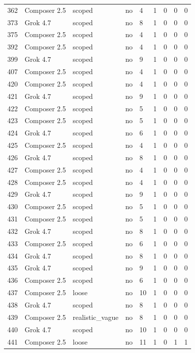 \begin{tabular}{lllllllll}
362 & Composer 2.5 & scoped & no & 4 & 1 & 0 & 0 & 0 \\
373 & Grok 4.7 & scoped & no & 8 & 1 & 0 & 0 & 0 \\
375 & Composer 2.5 & scoped & no & 4 & 1 & 0 & 0 & 0 \\
392 & Composer 2.5 & scoped & no & 4 & 1 & 0 & 0 & 0 \\
399 & Grok 4.7 & scoped & no & 9 & 1 & 0 & 0 & 0 \\
407 & Composer 2.5 & scoped & no & 4 & 1 & 0 & 0 & 0 \\
420 & Composer 2.5 & scoped & no & 4 & 1 & 0 & 0 & 0 \\
421 & Grok 4.7 & scoped & no & 9 & 1 & 0 & 0 & 0 \\
422 & Composer 2.5 & scoped & no & 5 & 1 & 0 & 0 & 0 \\
423 & Composer 2.5 & scoped & no & 5 & 1 & 0 & 0 & 0 \\
424 & Grok 4.7 & scoped & no & 6 & 1 & 0 & 0 & 0 \\
425 & Composer 2.5 & scoped & no & 4 & 1 & 0 & 0 & 0 \\
426 & Grok 4.7 & scoped & no & 8 & 1 & 0 & 0 & 0 \\
427 & Composer 2.5 & scoped & no & 4 & 1 & 0 & 0 & 0 \\
428 & Composer 2.5 & scoped & no & 4 & 1 & 0 & 0 & 0 \\
429 & Grok 4.7 & scoped & no & 9 & 1 & 0 & 0 & 0 \\
430 & Composer 2.5 & scoped & no & 5 & 1 & 0 & 0 & 0 \\
431 & Composer 2.5 & scoped & no & 5 & 1 & 0 & 0 & 0 \\
432 & Grok 4.7 & scoped & no & 8 & 1 & 0 & 0 & 0 \\
433 & Composer 2.5 & scoped & no & 6 & 1 & 0 & 0 & 0 \\
434 & Grok 4.7 & scoped & no & 8 & 1 & 0 & 0 & 0 \\
435 & Grok 4.7 & scoped & no & 9 & 1 & 0 & 0 & 0 \\
436 & Composer 2.5 & scoped & no & 6 & 1 & 0 & 0 & 0 \\
437 & Composer 2.5 & loose & no & 10 & 1 & 0 & 0 & 0 \\
438 & Grok 4.7 & scoped & no & 8 & 1 & 0 & 0 & 0 \\
439 & Composer 2.5 & realistic\_vague & no & 8 & 1 & 0 & 0 & 0 \\
440 & Grok 4.7 & scoped & no & 10 & 1 & 0 & 0 & 0 \\
441 & Composer 2.5 & loose & no & 11 & 1 & 0 & 1 & 1 \\

\end{tabular}
